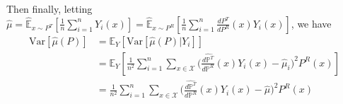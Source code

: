 \documentclass{article}
\begin{document}
Then finally, letting $\hat{\mu}=\hat{\mathbb{E}}_{x \sim P^T}\left[\frac{1}{n}\sum_{i=1}^nY_i(x)\right]=\hat{\mathbb{E}}_{x \sim P^R}\left[\frac{1}{n}\sum_{i=1}^n\frac{dP^T}{dP^R}(x)Y_i(x)\right]$, we have
\begin{align*}
    \text{Var}[\hat{\mu}(P)] &= \mathbb{E}_Y[\text{Var}[\hat{\mu}(P)|Y_i]] \\
    &=\mathbb{E}_Y\left[\frac{1}{n^2}\sum_{i=1}^n\sum_{x \in \mathcal{X}}\Bigg(\frac{\hat{d \mathbb{P}^T}}{d \mathbb{P}^R}(x) Y_i(x) - \hat{\mu}_i \Bigg)^2P^R(x)\right] \\
    &=\frac{1}{n^2}\sum_{i=1}^n\sum_{x \in \mathcal{X}}\Bigg(\frac{\hat{d \mathbb{P}^T}}{d \mathbb{P}^R}(x) Y_i(x) - \hat{\mu} \Bigg)^2P^R(x)
\end{align*}
\end{document}
